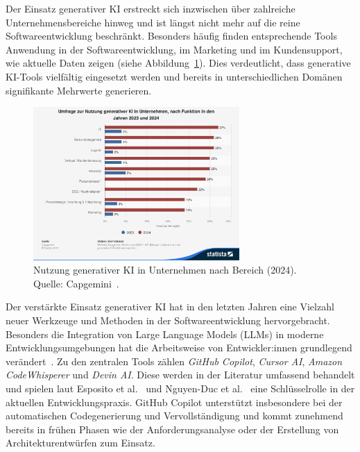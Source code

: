 
Der Einsatz generativer KI erstreckt sich inzwischen über zahlreiche
Unternehmensbereiche hinweg und ist längst nicht mehr auf die reine
Softwareentwicklung beschränkt. Besonders häufig finden entsprechende Tools
Anwendung in der Softwareentwicklung, im Marketing und im Kundensupport, wie
aktuelle Daten zeigen (siehe Abbildung~\ref{fig:ki-einsatzbereiche}). Dies
verdeutlicht, dass generative KI-Tools vielfältig eingesetzt werden und bereits
in unterschiedlichen Domänen signifikante Mehrwerte generieren.

\begin{figure}[H]
    \centering
    \vspace{1em}
    \includegraphics[width=0.7\textwidth]{images/abbildungen/statistic_id1483724_nutzung-generativer-ki-in-unternehmen-nach-bereich-2024.png}
    \caption{Nutzung generativer KI in Unternehmen nach Bereich (2024). Quelle: Capgemini~\cite{statista_ki_einsatzbereiche_2024}.}
    \label{fig:ki-einsatzbereiche}
\end{figure}

Der verstärkte Einsatz generativer KI hat in den letzten Jahren eine Vielzahl
neuer Werkzeuge und Methoden in der Softwareentwicklung hervorgebracht.
Besonders die Integration von Large Language Models (LLMs) in moderne
Entwicklungsumgebungen hat die Arbeitsweise von Entwickler:innen grundlegend
verändert~\cite{esposito_generative_2025,nguyen-duc_generative_2023}. Zu den
zentralen Tools zählen \textit{GitHub Copilot}, \textit{Cursor AI},
\textit{Amazon CodeWhisperer} und \textit{Devin AI}. Diese werden in der
Literatur umfassend behandelt und spielen laut Esposito et
al.~\cite{esposito_generative_2025} und Nguyen-Duc et
al.~\cite{nguyen-duc_generative_2023} eine Schlüsselrolle in der aktuellen
Entwicklungspraxis. GitHub Copilot unterstützt insbesondere bei der
automatischen Codegenerierung und Vervollständigung und kommt zunehmend bereits
in frühen Phasen wie der Anforderungsanalyse oder der Erstellung von
Architekturentwürfen zum Einsatz.


